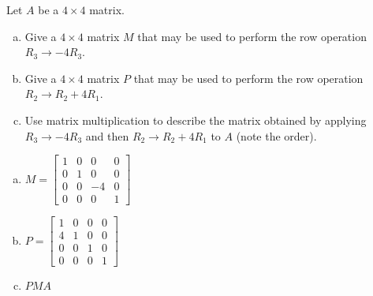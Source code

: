 
\begin{exerciseStatement}


Let \(A\) be a \(4 \times 4\) matrix.


\begin{enumerate}[(a)]
\item Give a \(4 \times 4\) matrix \(M\) that may be used to perform the row operation \( R_3 \to -4R_3 \).
\item Give a \(4 \times 4\) matrix \(P\) that may be used to perform the row operation \( R_2 \to R_2 + 4R_1 \).
\item Use matrix multiplication to describe the matrix obtained by applying \( R_3 \to -4R_3 \) and then \( R_2 \to R_2 + 4R_1 \) to \(A\) (note the order). 
\end{enumerate}
    
\end{exerciseStatement}
    
\begin{exerciseAnswer} 

\begin{enumerate}[(a)]
\item \(M= \left[\begin{array}{cccc}
1 & 0 & 0 & 0 \\
0 & 1 & 0 & 0 \\
0 & 0 & -4 & 0 \\
0 & 0 & 0 & 1
\end{array}\right] \)
\item \(P= \left[\begin{array}{cccc}
1 & 0 & 0 & 0 \\
4 & 1 & 0 & 0 \\
0 & 0 & 1 & 0 \\
0 & 0 & 0 & 1
\end{array}\right] \)
\item \(PMA\)
\end{enumerate}
    
\end{exerciseAnswer}
    
